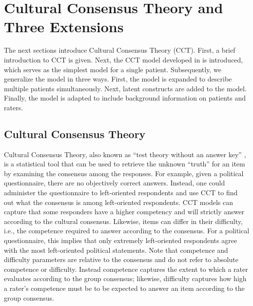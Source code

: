 \documentclass[a4paper,usenames,dvipsnames]{article}
\newenvironment{revision}{\color{black}}{\color{black}}
\begin{document}
\section*{Cultural Consensus Theory and Three Extensions}
The next sections introduce Cultural Consensus Theory (CCT). First, a brief introduction to CCT is given. Next, the CCT model developed in  is introduced, which serves as the simplest model for a single patient. Subsequently, we generalize the model in three ways. First, the model is expanded to describe multiple patients simultaneously. Next, latent constructs are added to the model. Finally, the model is adapted to include background information on patients and raters.

\subsection*{Cultural Consensus Theory}
Cultural Consensus Theory, also known as ``test theory without an answer key'' \cite{batchelder1988test}, is a statistical tool that can be used to retrieve the unknown ``truth'' for an item by examining the consensus among the responses. For example, given a political questionnaire, there are no objectively correct answers. Instead, one could administer the questionnaire to left-oriented respondents and use CCT to find out what the consensus is among left-oriented respondents. CCT models can capture that some responders have a higher competency and will strictly answer according to the cultural consensus. Likewise, items can differ in their difficulty, i.e., the competence required to answer according to the consensus. For a political questionnaire, this implies that only extremely left-oriented respondents agree with the most left-oriented political statements. Note that competence and difficulty parameters are relative to the consensus and do not refer to absolute competence or difficulty. Instead competence captures the extent to which a rater evaluates according to the group consensus; likewise, difficulty captures how \begin{revision}high a rater's competence must be to be expected to answer an item according to the group consensus.\end{revision}
\end{document}
